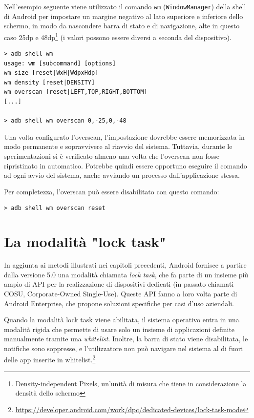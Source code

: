 Nell'esempio seguente viene utilizzato il comando \texttt{wm} (\texttt{WindowManager}) della shell di Android per impostare un margine negativo al lato superiore e inferiore dello schermo, in modo da nascondere barra di stato e di navigazione, alte in questo caso 25dp e 48dp\footnote{Density-independent Pixels, un'unità di misura che tiene in considerazione la densità dello schermo} (i valori possono essere diversi a seconda del dispositivo).

\begin{verbatim}
> adb shell wm
usage: wm [subcommand] [options]
wm size [reset|WxH|WdpxHdp]
wm density [reset|DENSITY]
wm overscan [reset|LEFT,TOP,RIGHT,BOTTOM]
[...]

> adb shell wm overscan 0,-25,0,-48
\end{verbatim}

Una volta configurato l'overscan, l'impostazione dovrebbe essere memorizzata in modo permanente e sopravvivere al riavvio del sistema. Tuttavia, durante le sperimentazioni si è verificato almeno una volta che l'overscan non fosse ripristinato in automatico. Potrebbe quindi essere opportuno eseguire il comando ad ogni avvio del sistema, anche avviando un processo dall'applicazione stessa.

Per completezza, l'overscan può essere disabilitato con questo comando:

\begin{verbatim}
> adb shell wm overscan reset
\end{verbatim}


\section{La modalità "lock task"}
\label{sec:kiosk_locktask}

In aggiunta ai metodi illustrati nei capitoli precedenti, Android fornisce a partire dalla versione 5.0 una modalità chiamata \emph{lock task}, che fa parte di un insieme più ampio di API per la realizzazione di dispositivi dedicati (in passato chiamati COSU, Corporate-Owned Single-Use). Queste API fanno a loro volta parte di Android Enterprise, che propone soluzioni specifiche per casi d'uso aziendali.

Quando la modalità lock task viene abilitata, il sistema operativo entra in una modalità rigida che permette di usare solo un insieme di applicazioni definite manualmente tramite una \emph{whitelist}. Inoltre, la barra di stato viene disabilitata, le notifiche sono soppresse, e l'utilizzatore non può navigare nel sistema al di fuori delle app inserite in whitelist.\footnote{\url{https://developer.android.com/work/dpc/dedicated-devices/lock-task-mode}}

